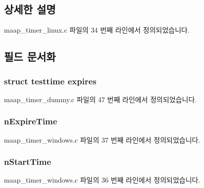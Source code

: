 \subsection{상세한 설명}


maap\+\_\+timer\+\_\+linux.\+c 파일의 34 번째 라인에서 정의되었습니다.



\subsection{필드 문서화}
\subsubsection[{\texorpdfstring{expires}{expires}}]{\setlength{\rightskip}{0pt plus 5cm}struct {\bf testtime} expires}\hypertarget{structmaap__timer_ad187e9b153f22ba3fd0de2a0860820fa}{}\label{structmaap__timer_ad187e9b153f22ba3fd0de2a0860820fa}


maap\+\_\+timer\+\_\+dummy.\+c 파일의 47 번째 라인에서 정의되었습니다.

\subsubsection[{\texorpdfstring{n\+Expire\+Time}{nExpireTime}}]{ n\+Expire\+Time}\hypertarget{structmaap__timer_a8be40bda552e67ed8f64804d45b36a93}{}\label{structmaap__timer_a8be40bda552e67ed8f64804d45b36a93}


maap\+\_\+timer\+\_\+windows.\+c 파일의 37 번째 라인에서 정의되었습니다.

\subsubsection[{\texorpdfstring{n\+Start\+Time}{nStartTime}}]{ n\+Start\+Time}\hypertarget{structmaap__timer_aa074c250d08298b910b1d395bcd3bd9a}{}\label{structmaap__timer_aa074c250d08298b910b1d395bcd3bd9a}


maap\+\_\+timer\+\_\+windows.\+c 파일의 36 번째 라인에서 정의되었습니다.

